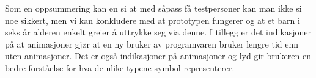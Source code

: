 Som en oppsummering kan en si at med såpass få testpersoner kan man ikke si noe sikkert, men vi kan konkludere med at prototypen fungerer og at et barn i seks år alderen enkelt greier å uttrykke seg via denne. I tillegg er det indikasjoner på at animasjoner gjør at en ny bruker av programvaren bruker lengre tid enn uten animasjoner. Det er også indikasjoner på animasjoner og lyd gir brukeren en bedre forståelse for hva de ulike typene symbol representerer.  
 

 

 
 
 
 
 
 
 
 
 
 
 
 
